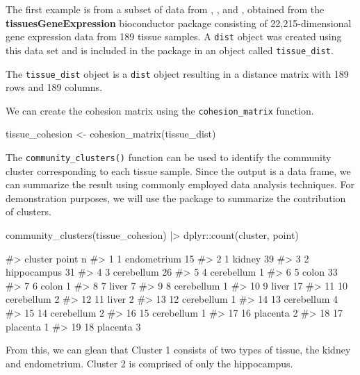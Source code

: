 The first example is from a subset of data from \citet{zilliox2007gene},
\citet{mccall2011gene}, and \citet{mccall2014gene}, obtained from the
\textbf{tissuesGeneExpression} bioconductor package \citep{tissue}
consisting of 22,215-dimensional gene expression data from 189 tissue
samples. A \texttt{dist} object was created using this data set and is
included in the  package in an object called
\texttt{tissue\_dist}.

The \texttt{tissue\_dist} object is a \texttt{dist} object resulting in
a distance matrix with 189 rows and 189 columns.

We can create the cohesion matrix using the \texttt{cohesion\_matrix}
function.

\begin{Schunk}
\begin{Sinput}
tissue_cohesion <- cohesion_matrix(tissue_dist)
\end{Sinput}
\end{Schunk}

The \texttt{community\_clusters()} function can be used to identify the
community cluster corresponding to each tissue sample. Since the output
is a data frame, we can summarize the result using commonly employed
data analysis techniques. For demonstration purposes, we will use the
 package to summarize the contribution of clusters.

\begin{Schunk}
\begin{Sinput}
community_clusters(tissue_cohesion) |>
  dplyr::count(cluster, point)
\end{Sinput}
\begin{Soutput}
#>    cluster       point  n
#> 1        1 endometrium 15
#> 2        1      kidney 39
#> 3        2 hippocampus 31
#> 4        3  cerebellum 26
#> 5        4  cerebellum  1
#> 6        5       colon 33
#> 7        6       colon  1
#> 8        7       liver  7
#> 9        8  cerebellum  1
#> 10       9       liver 17
#> 11      10  cerebellum  2
#> 12      11       liver  2
#> 13      12  cerebellum  1
#> 14      13  cerebellum  4
#> 15      14  cerebellum  2
#> 16      15  cerebellum  1
#> 17      16    placenta  2
#> 18      17    placenta  1
#> 19      18    placenta  3
\end{Soutput}
\end{Schunk}

From this, we can glean that Cluster 1 consists of two types of tissue,
the kidney and endometrium. Cluster 2 is comprised of only the
hippocampus.

